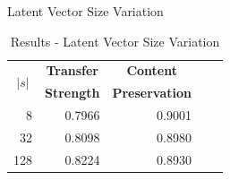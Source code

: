 \documentclass[aspectratio=169]{beamer}
\newcommand{\tabh}[1]{\multicolumn{1}{c|}{\textbf{#1}}}
\newcommand{\tabc}[2]{\multicolumn{1}{|c||}{\multirow{#1}{*}{\textbf{#2}}}}
\begin{document}
\begin{frame}{Latent Vector Size Variation}
	\begin{table}[ht]
		\centering
		\begin{tabular}{| r || r | r | r | r |}
			\hline
			\tabc{2}{$|s|$} & \tabh{Transfer} & \tabh{Content}      \\
			                & \tabh{Strength} & \tabh{Preservation} \\
			\hline
			\hline
			8               & 0.7966          & 0.9001              \\
			\hline
			32              & 0.8098          & 0.8980              \\
			\hline
			128             & 0.8224          & 0.8930              \\
			\hline
		\end{tabular}
		\caption{Results - Latent Vector Size Variation}
		\label{tab:latent-vector-variation}
	\end{table}
\end{frame}
\end{document}
